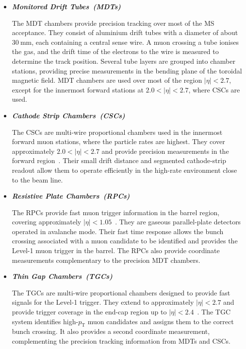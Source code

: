 \begin{itemize}
    \item \textbf{\textit{Monitored Drift Tubes~(MDTs)\quad}}

    The MDT chambers provide precision tracking over most of the MS acceptance.
    They consist of aluminium drift tubes with a diameter of about $30~\mathrm{mm}$, each containing a central sense wire.
    A muon crossing a tube ionises the gas, and the drift time of the electrons to the wire is measured to determine the track position.
    Several tube layers are grouped into chamber stations, providing precise measurements in the bending plane of the toroidal magnetic field.
    MDT chambers are used over most of the region $|\eta|<2.7$, except for the innermost forward stations at $2.0<|\eta|<2.7$, where CSCs are used.

    \item \textbf{\textit{Cathode Strip Chambers~(CSCs)\quad}}

    The CSCs are multi-wire proportional chambers used in the innermost forward muon stations, where the particle rates are highest.
    They cover approximately $2.0<|\eta|<2.7$ and provide precision measurements in the forward region~\cite{ATLASDetector2008}.
    Their small drift distance and segmented cathode-strip readout allow them to operate efficiently in the high-rate environment close to the beam line.

    \item \textbf{\textit{Resistive Plate Chambers~(RPCs)\quad}}

    The RPCs provide fast muon trigger information in the barrel region, covering approximately $|\eta|<1.05$~\cite{ATLASDetector2008}.
    They are gaseous parallel-plate detectors operated in avalanche mode.
    Their fast time response allows the bunch crossing associated with a muon candidate to be identified and provides the Level-1 muon trigger in the barrel.
    The RPCs also provide coordinate measurements complementary to the precision MDT chambers.

    \item \textbf{\textit{Thin Gap Chambers~(TGCs)\quad}}

    The TGCs are multi-wire proportional chambers designed to provide fast signals for the Level-1 trigger.
    They extend to approximately $|\eta|<2.7$ and provide trigger coverage in the end-cap region up to $|\eta|<2.4$~\cite{ATLASDetector2008}.
    The TGC system identifies high-$p_{\mathrm{T}}$ muon candidates and assigns them to the correct bunch crossing.
    It also provides a second coordinate measurement, complementing the precision tracking information from MDTs and CSCs.
\end{itemize}

